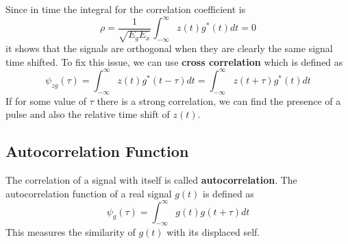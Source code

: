 \documentclass{article}
\begin{document}
    Since in time the integral for the correlation coefficient is
    \begin{equation}
        \rho = \frac{1}{\sqrt{E_gE_x}}\int_{-\infty}^{\infty}z(t)g^*(t)dt = 0
    \end{equation}
    it shows that the signals are orthogonal when they are clearly the same signal time shifted. To fix this issue, we can use \textbf{cross correlation} 
    which is defined as
    \begin{equation}
        \psi_{zg}(\tau) = \int_{-\infty}^{\infty}z(t)g^*(t-\tau)dt = \int_{-\infty}^{\infty}z(t + \tau)g^*(t)dt
    \end{equation}
    If for some value of $\tau$ there is a strong correlation, we can find the presence of a pulse and also the relative time shift of $z(t)$. 

    \subsection{Autocorrelation Function}
    The correlation of a signal with itself is called \textbf{autocorrelation}. The autocorrelation function of a real signal $g(t)$ is defined as
    \begin{equation}
        \psi_{g}(\tau) = \int_{-\infty}^{\infty}g(t)g(t+\tau)dt
    \end{equation}
    This measures the similarity of $g(t)$ with its displaced self.  
\end{document}
